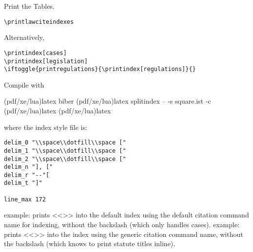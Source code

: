 \yin Print the Tables.
\yq
\begin{verbatim}
\printlawciteindexes
\end{verbatim}
\yqq

Alternatively,

\yq
\begin{verbatim}
\printindex[cases]
\printindex[legislation]
\iftoggle{printregulations}{\printindex[regulations]}{}
\end{verbatim}
\yqq


%
\yee

\bigskip
{}

\bigskip
Compile with

\yi
\yim (pdf/xe/lua)latex
\yim biber
\yim (pdf/xe/lua)latex
\yim splitindex -- -s square.ist -c
\yim (pdf/xe/lua)latex
\yim (pdf/xe/lua)latex
\yii

where the index style file  is:

\yq
\begin{verbatim}
delim_0 "\\space\\dotfill\\space ["
delim_1 "\\space\\dotfill\\space ["
delim_2 "\\space\\dotfill\\space ["
delim_n "], ["
delim_r "--"[
delim_t "]"

line_max 172
\end{verbatim}
\yqq





\bigskip
{}

\yd
{} example:  prints <<>> into the default  index using the default citation command name for indexing,  without the backslash (which only handles cases).
 example:  prints <<>> into the  index using the generic citation command name,  without the backslash (which knows to print statute titles inline).
\ydd


